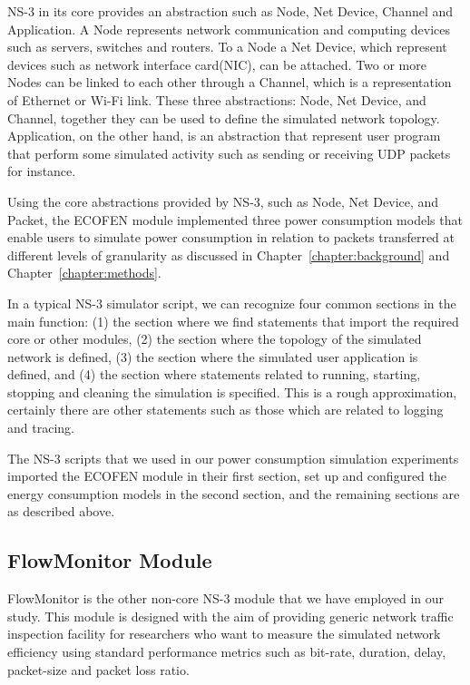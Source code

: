 NS-3 in its core provides an abstraction such as Node, Net Device, Channel and Application. A Node represents  network communication and computing devices such as servers, switches and routers. To a Node a Net Device, which represent devices such as network interface card(NIC), can be attached. Two or more Nodes can be linked to each other through a Channel, which is a representation of Ethernet or Wi-Fi link. These three abstractions: Node, Net Device, and Channel, together they can be used to define the simulated network topology. Application, on the other hand, is an abstraction that represent user program that perform some simulated activity such as sending or receiving UDP packets for instance\cite{ns3}. 

Using the core abstractions provided by NS-3, such as  Node, Net Device, and Packet, the ECOFEN module implemented three power consumption models that enable users to simulate power consumption in relation to packets transferred at different levels of granularity as discussed in Chapter~\ref{chapter:background} and Chapter~\ref{chapter:methods}.

In a typical NS-3 simulator script, we can recognize four common sections in the main function: (1) the section where we find statements that import the required core or other modules, (2) the section where the topology of the simulated network is defined, (3) the section where the simulated user application is defined, and (4) the section where statements related to running, starting, stopping and cleaning the simulation is specified. This is a rough approximation, certainly there are other statements such as those which are related to logging and tracing. 

The NS-3 scripts that we used in our power consumption simulation experiments imported the ECOFEN module in their first section, set up and configured the energy consumption models in the second section, and the remaining sections are as described above. 
\subsection{FlowMonitor Module}
FlowMonitor is the other non-core NS-3 module that we have employed in our study. This module is designed with the aim of providing generic network traffic inspection facility for researchers who want to measure the simulated network efficiency using standard performance metrics such as bit-rate, duration, delay, packet-size and packet loss ratio\cite{DBLP:conf/valuetools/CarneiroFR09}.  

